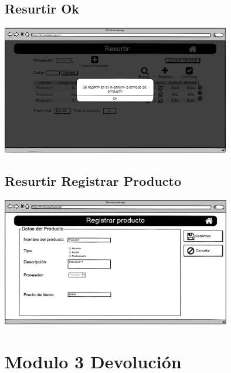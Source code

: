 \begin{flushleft}
	\subsection{Resurtir Ok} \label{UI: resurtir ok}
	\begin{center}
		\includegraphics[width=10cm]{pantallas/images/17resurtirok.png}\\	
		 	
	\end{center}
	\subsection{Resurtir Registrar Producto} \label{UI: resurtir registrar}
	\begin{center}
		\includegraphics[width=10cm]{pantallas/images/18resurtirregistrarproducto.png}\\	
		 	
	\end{center}
	\newpage
	\section{Modulo 3 Devolución}

\end{flushleft}
